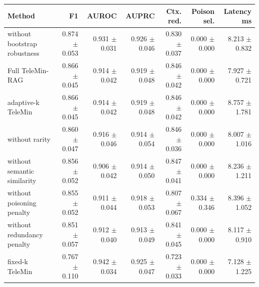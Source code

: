 \begin{tabular}{lrrrrrr}
\toprule
Method & F1 & AUROC & AUPRC & Ctx. red. & Poison sel. & Latency ms \\
\midrule
without bootstrap robustness & 0.874 $\pm$ 0.053 & 0.931 $\pm$ 0.031 & 0.926 $\pm$ 0.046 & 0.830 $\pm$ 0.037 & 0.000 $\pm$ 0.000 & 8.213 $\pm$ 0.832 \\
Full TeleMin-RAG & 0.866 $\pm$ 0.045 & 0.914 $\pm$ 0.042 & 0.919 $\pm$ 0.048 & 0.846 $\pm$ 0.042 & 0.000 $\pm$ 0.000 & 7.927 $\pm$ 0.721 \\
adaptive-k TeleMin & 0.866 $\pm$ 0.045 & 0.914 $\pm$ 0.042 & 0.919 $\pm$ 0.048 & 0.846 $\pm$ 0.042 & 0.000 $\pm$ 0.000 & 8.757 $\pm$ 1.781 \\
without rarity & 0.860 $\pm$ 0.047 & 0.916 $\pm$ 0.046 & 0.914 $\pm$ 0.054 & 0.846 $\pm$ 0.036 & 0.000 $\pm$ 0.000 & 8.007 $\pm$ 1.016 \\
without semantic similarity & 0.856 $\pm$ 0.052 & 0.906 $\pm$ 0.042 & 0.914 $\pm$ 0.050 & 0.847 $\pm$ 0.041 & 0.000 $\pm$ 0.000 & 8.236 $\pm$ 1.211 \\
without poisoning penalty & 0.855 $\pm$ 0.052 & 0.911 $\pm$ 0.044 & 0.918 $\pm$ 0.053 & 0.807 $\pm$ 0.067 & 0.334 $\pm$ 0.346 & 8.396 $\pm$ 1.052 \\
without redundancy penalty & 0.851 $\pm$ 0.057 & 0.912 $\pm$ 0.040 & 0.913 $\pm$ 0.049 & 0.841 $\pm$ 0.045 & 0.000 $\pm$ 0.000 & 8.117 $\pm$ 0.910 \\
fixed-k TeleMin & 0.767 $\pm$ 0.110 & 0.942 $\pm$ 0.034 & 0.925 $\pm$ 0.047 & 0.723 $\pm$ 0.033 & 0.000 $\pm$ 0.000 & 7.128 $\pm$ 1.225 \\
\bottomrule
\end{tabular}

